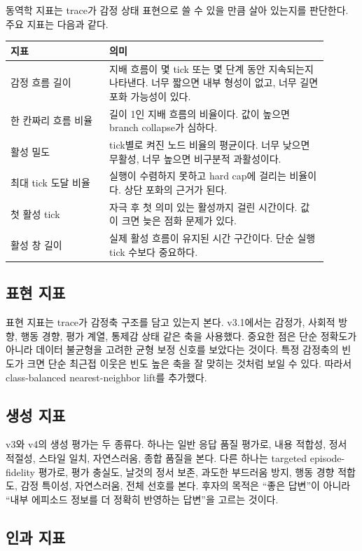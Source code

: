 \documentclass[11pt,a4paper]{article}
\begin{document}
동역학 지표는 trace가 감정 상태 표현으로 쓸 수 있을 만큼 살아 있는지를 판단한다. 주요 지표는 다음과 같다.

\begin{longtable}{p{0.28\linewidth}p{0.62\linewidth}}
\toprule
지표 & 의미 \\
\midrule
감정 흐름 길이 & 지배 흐름이 몇 tick 또는 몇 단계 동안 지속되는지 나타낸다. 너무 짧으면 내부 형성이 없고, 너무 길면 포화 가능성이 있다. \\
한 칸짜리 흐름 비율 & 길이 1인 지배 흐름의 비율이다. 값이 높으면 branch collapse가 심하다. \\
활성 밀도 & tick별로 켜진 노드 비율의 평균이다. 너무 낮으면 무활성, 너무 높으면 비구분적 과활성이다. \\
최대 tick 도달 비율 & 실행이 수렴하지 못하고 hard cap에 걸리는 비율이다. 상단 포화의 근거가 된다. \\
첫 활성 tick & 자극 후 첫 의미 있는 활성까지 걸린 시간이다. 값이 크면 늦은 점화 문제가 있다. \\
활성 창 길이 & 실제 활성 흐름이 유지된 시간 구간이다. 단순 실행 tick 수보다 중요하다. \\
\bottomrule
\end{longtable}

\subsection{표현 지표}

표현 지표는 trace가 감정축 구조를 담고 있는지 본다. v3.1에서는 감정가, 사회적 방향, 행동 경향, 평가 계열, 통제감 상태 같은 축을 사용했다. 중요한 점은 단순 정확도가 아니라 데이터 불균형을 고려한 균형 보정 신호를 보았다는 것이다. 특정 감정축의 빈도가 크면 단순 최근접 이웃은 빈도 높은 축을 잘 맞히는 것처럼 보일 수 있다. 따라서 class-balanced nearest-neighbor lift를 추가했다.

\subsection{생성 지표}

v3와 v4의 생성 평가는 두 종류다. 하나는 일반 응답 품질 평가로, 내용 적합성, 정서 적절성, 스타일 일치, 자연스러움, 종합 품질을 본다. 다른 하나는 targeted episode-fidelity 평가로, 평가 충실도, 날것의 정서 보존, 과도한 부드러움 방지, 행동 경향 적합도, 감정 특이성, 자연스러움, 전체 선호를 본다. 후자의 목적은 ``좋은 답변''이 아니라 ``내부 에피소드 정보를 더 정확히 반영하는 답변''을 고르는 것이다.

\subsection{인과 지표}
\end{document}
